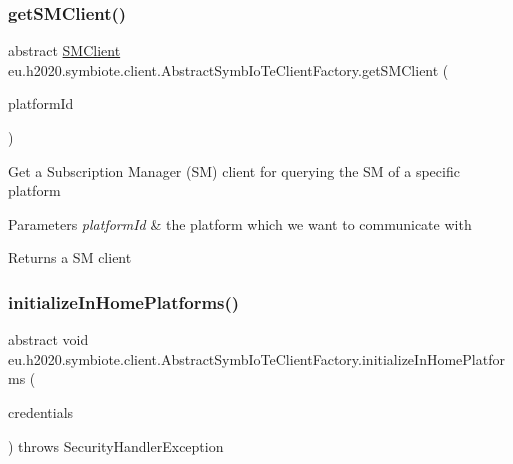 \subsubsection{\texorpdfstring{get\+S\+M\+Client()}{getSMClient()}}
{\footnotesize\ttfamily abstract \hyperlink{interfaceeu_1_1h2020_1_1symbiote_1_1client_1_1interfaces_1_1SMClient}{S\+M\+Client} eu.\+h2020.\+symbiote.\+client.\+Abstract\+Symb\+Io\+Te\+Client\+Factory.\+get\+S\+M\+Client (\begin{DoxyParamCaption}\item[{String}]{platform\+Id }\end{DoxyParamCaption})\hspace{0.3cm}{\ttfamily [abstract]}}

Get a Subscription Manager (SM) client for querying the SM of a specific platform


\begin{DoxyParams}{Parameters}
{\em platform\+Id} & the platform which we want to communicate with \\
\hline
\end{DoxyParams}
\begin{DoxyReturn}{Returns}
a SM client 
\end{DoxyReturn}
\mbox{\label{classeu_1_1h2020_1_1symbiote_1_1client_1_1AbstractSymbIoTeClientFactory_afca76e860ef08850f4fb985527542447}} 
\subsubsection{\texorpdfstring{initialize\+In\+Home\+Platforms()}{initializeInHomePlatforms()}}
{\footnotesize\ttfamily abstract void eu.\+h2020.\+symbiote.\+client.\+Abstract\+Symb\+Io\+Te\+Client\+Factory.\+initialize\+In\+Home\+Platforms (\begin{DoxyParamCaption}\item[{Set$<$ Home\+Platform\+Credentials $>$}]{credentials }\end{DoxyParamCaption}) throws Security\+Handler\+Exception\hspace{0.3cm}{\ttfamily [abstract]}}

